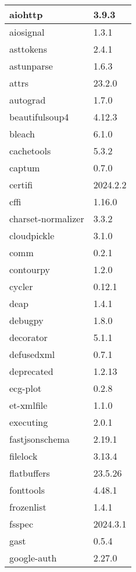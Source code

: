 \begin{longtable}{|l|l|}
	aiohttp              & 3.9.3 \\ \hline
	aiosignal            & 1.3.1 \\ \hline
	asttokens            & 2.4.1 \\ \hline
	astunparse           & 1.6.3 \\ \hline
	attrs                & 23.2.0 \\ \hline
	autograd             & 1.7.0 \\ \hline
	beautifulsoup4       & 4.12.3 \\ \hline
	bleach               & 6.1.0 \\ \hline
	cachetools           & 5.3.2 \\ \hline
	captum               & 0.7.0 \\ \hline
	certifi              & 2024.2.2 \\ \hline
	cffi                 & 1.16.0 \\ \hline
	charset-normalizer   & 3.3.2 \\ \hline
	cloudpickle          & 3.1.0 \\ \hline
	comm                 & 0.2.1 \\ \hline
	contourpy            & 1.2.0 \\ \hline
	cycler               & 0.12.1 \\ \hline
	deap                 & 1.4.1 \\ \hline
	debugpy              & 1.8.0 \\ \hline
	decorator            & 5.1.1 \\ \hline
	defusedxml           & 0.7.1 \\ \hline
	deprecated           & 1.2.13 \\ \hline
	ecg-plot             & 0.2.8 \\ \hline
	et-xmlfile           & 1.1.0 \\ \hline
	executing            & 2.0.1 \\ \hline
	fastjsonschema       & 2.19.1 \\ \hline
	filelock             & 3.13.4 \\ \hline
	flatbuffers          & 23.5.26 \\ \hline
	fonttools            & 4.48.1 \\ \hline
	frozenlist           & 1.4.1 \\ \hline
	fsspec               & 2024.3.1 \\ \hline
	gast                 & 0.5.4 \\ \hline
	google-auth          & 2.27.0 \\ \hline

\end{longtable}
